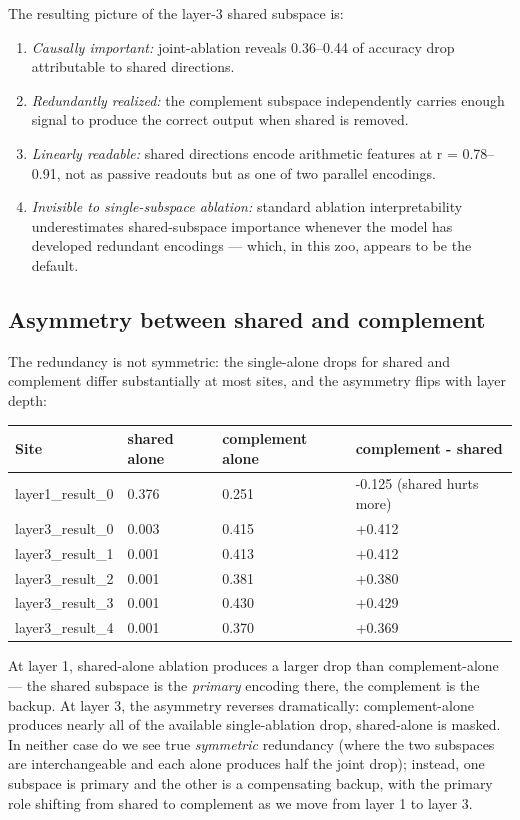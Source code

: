 The resulting picture of the layer-3 shared subspace is:

\begin{enumerate}
  \item \emph{Causally important:} joint-ablation reveals 0.36--0.44 of accuracy drop attributable to shared directions.
  \item \emph{Redundantly realized:} the complement subspace independently carries enough signal to produce the correct output when shared is removed.
  \item \emph{Linearly readable:} shared directions encode arithmetic features at r = 0.78--0.91, not as passive readouts but as one of two parallel encodings.
  \item \emph{Invisible to single-subspace ablation:} standard ablation interpretability underestimates shared-subspace importance whenever the model has developed redundant encodings --- which, in this zoo, appears to be the default.
\end{enumerate}

\subsection{Asymmetry between shared and complement}

The redundancy is not symmetric: the single-alone drops for shared and
complement differ substantially at most sites, and the asymmetry flips
with layer depth:

\begin{center}
\begin{tabular}{|l|l|l|l|}
\hline
\textbf{Site} & \textbf{shared alone} & \textbf{complement alone} & \textbf{complement - shared} \\
\hline
layer1\_result\_0 & 0.376 & 0.251 & -0.125 (shared hurts more) \\
layer3\_result\_0 & 0.003 & 0.415 & +0.412 \\
layer3\_result\_1 & 0.001 & 0.413 & +0.412 \\
layer3\_result\_2 & 0.001 & 0.381 & +0.380 \\
layer3\_result\_3 & 0.001 & 0.430 & +0.429 \\
layer3\_result\_4 & 0.001 & 0.370 & +0.369 \\
\hline
\end{tabular}
\end{center}


At layer 1, shared-alone ablation produces a larger drop than
complement-alone --- the shared subspace is the \emph{primary} encoding there,
the complement is the backup. At layer 3, the asymmetry reverses
dramatically: complement-alone produces nearly all of the available
single-ablation drop, shared-alone is masked. In neither case do we see
true \emph{symmetric} redundancy (where the two subspaces are interchangeable
and each alone produces half the joint drop); instead, one subspace is
primary and the other is a compensating backup, with the primary role
shifting from shared to complement as we move from layer 1 to layer 3.

